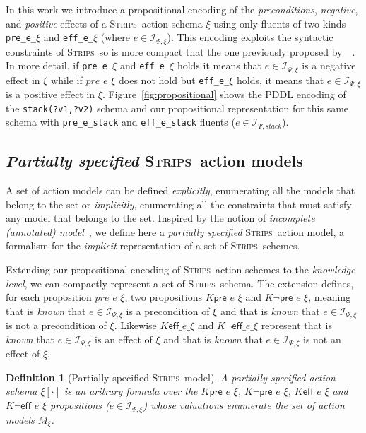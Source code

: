 \documentclass{article}
\newcommand{\pre}{\mathsf{pre}}     %
\newcommand{\eff}{\mathsf{eff}}     %
\newcommand{\strips}{\textsc{Strips}}
\newtheorem{definition}[theorem]{Definition}
\begin{document}
In this work we introduce a propositional encoding of the {\em preconditions}, {\em negative}, and {\em positive} effects of a \strips\ action schema $\xi$ using only fluents of two kinds {\tt\small pre\_e\_$\xi$} and {\tt\small eff\_e\_$\xi$} (where $e\in{\mathcal I}_{\Psi,\xi}$). This encoding exploits the syntactic constraints of \strips\ so is more compact that the one previously proposed by~\citeauthor{aineto2018learning}~\citeyear{aineto2018learning}. In more detail, if {\tt\small pre\_e\_$\xi$} and {\tt\small eff\_e\_$\xi$} holds it means that $e\in{\mathcal I}_{\Psi,\xi}$ is a negative effect in $\xi$ while if $pre\_e\_\xi$ does not hold but {\tt\small eff\_e\_$\xi$} holds, it means that $e\in{\mathcal I}_{\Psi,\xi}$ is a positive effect in $\xi$. Figure~\ref{fig:propositional} shows the PDDL encoding of the {\tt\small stack(?v1,?v2)} schema and our propositional representation for this same schema with {\tt\small pre\_e\_stack} and {\tt\small eff\_e\_stack} fluents ($e\in{\mathcal I}_{\Psi,stack}$). 

\subsection{{\em Partially specified} \strips\ action models}
A set of action models can be defined {\em explicitly}, enumerating all the models that belong to the set or {\em implicitly}, enumerating all the constraints that must satisfy any model that belongs to the set. Inspired by the notion of {\em incomplete (annotated) model}~\cite{sreedharan2018handling}, we define here a {\em partially specified} \strips\ action model, a formalism for the {\em implicit} representation of a set of \strips\ schemes.

Extending our propositional encoding of \strips\ action schemes to the {\em knowledge level}, we can compactly represent a set of \strips\ schema. The extension defines, for each proposition {\tt\small $pre\_e\_\xi$}, two propositions {\tt\small $K\pre\_e\_\xi$} and {\tt\small $K\neg\pre\_e\_\xi$}, meaning that is {\em known} that $e\in{\mathcal I}_{\Psi,\xi}$ is a precondition of $\xi$ and that is {\em known} that $e\in{\mathcal I}_{\Psi,\xi}$ is not a precondition of $\xi$. Likewise {\tt\small $K\eff\_e\_\xi$} and {\tt\small $K\neg\eff\_e\_\xi$} represent that is {\em known} that $e\in{\mathcal I}_{\Psi,\xi}$ is an effect of $\xi$ and that is {\em known} that $e\in{\mathcal I}_{\Psi,\xi}$ is not an effect of $\xi$.

\begin{definition}[Partially specified \strips\ model]
A {\em partially specified action schema} $\xi[\cdot]$ is an aritrary formula over the {\tt\small $K\pre\_e\_\xi$}, {\tt\small $K\neg\pre\_e\_\xi$}, {\tt\small $K\eff\_e\_\xi$} and {\tt\small $K\neg\eff\_e\_\xi$} propositions ($e\in{\mathcal I}_{\Psi,\xi}$) whose valuations enumerate the set of action models $M_\xi$.
\end{definition}
\end{document}
